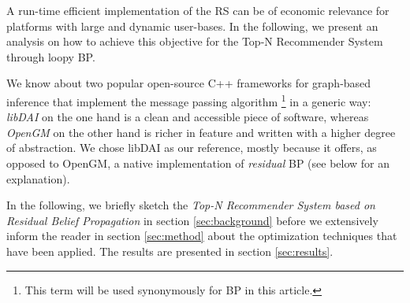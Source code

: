 A run-time efficient implementation of the RS can be of economic relevance for platforms with large and dynamic user-bases. In the following, we present an analysis on how to achieve this objective for the Top-N Recommender System through loopy BP.

We know about two popular open-source C++ frameworks for graph-based inference that implement the message passing algorithm \footnote{This term will be used synonymously for BP in this article.} in a generic way: \textit{libDAI} \cite{Mooij_libDAI_10} on the one hand is a clean and accessible piece of software, whereas \textit{OpenGM} \cite{andres2012opengm} on the other hand is richer in feature and written with a higher degree of abstraction. We chose libDAI as our reference, mostly because it offers, as opposed to OpenGM, a native implementation of \textit{residual} BP (see below for an explanation). 

In the following, we briefly sketch the \textit{Top-N Recommender System based on Residual Belief Propagation} in section \ref{sec:background} before we extensively inform the reader in section \ref{sec:method} about the optimization techniques that have been applied. The results are presented in section \ref{sec:results}.